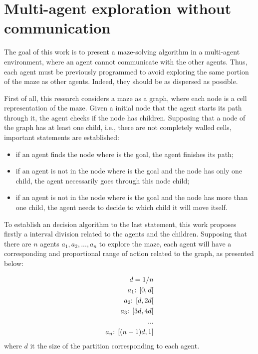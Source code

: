 \section{Multi-agent exploration without communication}
\label{section_models_mixed_radix}
The goal of this work is to present a maze-solving algorithm in a multi-agent environment, where an agent cannot communicate with the other agents. Thus, each agent must be previously programmed to avoid exploring the same portion of the maze as other agents. Indeed, they should be as dispersed as possible.

First of all, this research considers a maze as a graph, where each node is a cell representation of the maze. Given a initial node that the agent starts its path through it, the agent checks if the node has children. Supposing that a node of the graph has at least one child, i.e., there are not completely walled cells, important statements are established:

\begin{itemize}
\item if an agent finds the node where is the goal, the agent finishes its path;

\item if an agent is not in the node where is the goal and the node has only one child, the agent necessarily goes through this node child;

\item if an agent is not in the node where is the goal and the node has more than one child, the agent needs to decide to which child it will move itself.
\end{itemize}

To establish an decision algorithm to the last statement, this work proposes firstly a interval division related to the agents and the children. Supposing that there are $n$ agents $a_{1}, a_{2},...,a_{n}$ to explore the maze, each agent will have a corresponding and proportional range of action related to the graph, as presented below:

\begin{equation}
	\begin{align}
			d = 1/n\\
		a_{1} \textnormal{: } [0, d[\\
		a_{2} \textnormal{: } [d, 2d[\\
		a_{3} \textnormal{: } [3d, 4d[\\
		...\\
		a_{n} \textnormal{: } [(n-1)d, 1]
	\end{align}
\end{equation}
where $d$ it the size of the partition corresponding to each agent.

